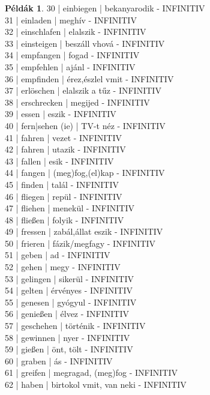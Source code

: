 \documentclass{article}
\theoremstyle{definition}
\newtheorem*{exmp}{Példák}
\begin{document}
\begin{exmp}
30 | einbiegen | bekanyarodik - INFINITIV\\
31 | einladen | meghív - INFINITIV\\
32 | einschlafen | elalszik - INFINITIV\\
33 | einsteigen | beszáll vhová - INFINITIV\\
34 | empfangen | fogad - INFINITIV\\
35 | empfehlen | ajánl - INFINITIV\\
36 | empfinden | érez,észlel vmit - INFINITIV\\
37 | erlöschen | elalszik a tűz - INFINITIV\\
38 | erschrecken | megijed - INFINITIV\\
39 | essen | eszik - INFINITIV\\
40 | fern|sehen (ie) | TV-t néz - INFINITIV\\
41 | fahren | vezet - INFINITIV\\
42 | fahren | utazik - INFINITIV\\
43 | fallen | esik - INFINITIV\\
44 | fangen | (meg)fog,(el)kap - INFINITIV\\
45 | finden | talál - INFINITIV\\
46 | fliegen | repül - INFINITIV\\
47 | fliehen | menekül - INFINITIV\\
48 | fließen | folyik - INFINITIV\\
49 | fressen | zabál,állat eszik - INFINITIV\\
50 | frieren | fázik/megfagy - INFINITIV\\
51 | geben | ad - INFINITIV\\
52 | gehen | megy - INFINITIV\\
53 | gelingen | sikerül - INFINITIV\\
54 | gelten | érvényes - INFINITIV\\
55 | genesen | gyógyul - INFINITIV\\
56 | genießen | élvez - INFINITIV\\
57 | geschehen | történik - INFINITIV\\
58 | gewinnen | nyer - INFINITIV\\
59 | gießen | önt, tölt - INFINITIV\\
60 | graben | ás - INFINITIV\\
61 | greifen | megragad, (meg)fog - INFINITIV\\
62 | haben | birtokol vmit, van neki - INFINITIV\\

\end{exmp}
\end{document}
